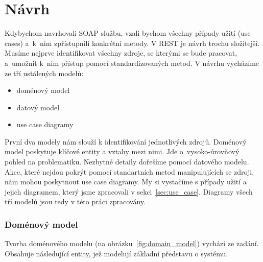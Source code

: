 \chapter{Návrh}

Kdybychom navrhovali SOAP službu, vzali bychom všechny případy užití (use cases) a~k~nim zpřístupnili
konkrétní metody. V REST je návrh trochu složitejší.
Musíme nejprve identifikovat všechny zdroje, se kterými se bude pracovat, a~umožnit
k~nim přístup pomocí standardizovaných metod. V návrhu vycházíme ze tří ustálených modelů:

\begin{itemize}
\item doménový model
\item datový model
\item use case diagramy
\end{itemize}

První dva modely nám slouží k identifikování jednotlivých zdrojů.
Doménový model poskytuje klíčové entity a vztahy mezi nimi.
Jde o~vysoko-úrovňový pohled na problematiku. Nezbytné detaily dořešíme pomocí datového modelu. 
Akce, které nejdou pokrýt pomocí standartních metod manipulujících se zdroji, nám mohou poskytnout use case diagramy.
My si vystačíme s případy užití a jejich diagramem, který jsme zpracovali v sekci~\ref{sec:use_case}. 
Diagramy všech tří modelů jsou tedy v této práci zpracovány.

\subsection{Doménový model}

Tvorba doménového modelu (na obrázku~\ref{fig:domain_model}) vychází ze zadání. Obsahuje následující entity,
jež modelují základní představu o systému.

